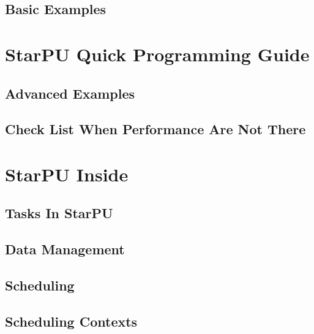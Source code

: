 \chapter{Basic Examples}
\label{BasicExamples}
\hypertarget{BasicExamples}{}


\part{StarPU Quick Programming Guide}

\chapter{Advanced Examples}
\label{AdvancedExamples}
\hypertarget{AdvancedExamples}{}


\chapter{Check List When Performance Are Not There}
\label{CheckListWhenPerformanceAreNotThere}
\hypertarget{CheckListWhenPerformanceAreNotThere}{}


\part{StarPU Inside}

\chapter{Tasks In StarPU}
\label{TasksInStarPU}
\hypertarget{TasksInStarPU}{}


\chapter{Data Management}
\label{DataManagement}
\hypertarget{DataManagement}{}


\chapter{Scheduling}
\label{Scheduling}
\hypertarget{Scheduling}{}


\chapter{Scheduling Contexts}
\label{SchedulingContexts}
\hypertarget{SchedulingContexts}{}


